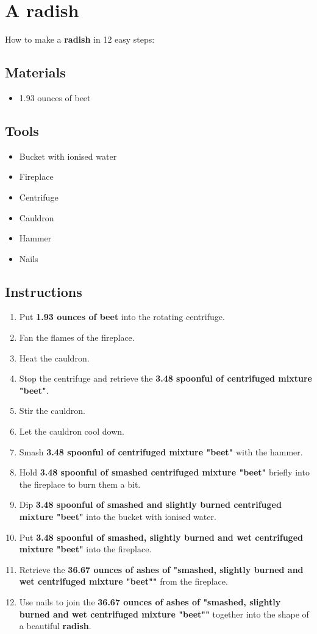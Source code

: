 \documentclass{article}
\begin{document}
\section{A radish}How to make a \textbf{radish} in 12 easy steps:

\subsection{Materials}\begin{itemize}
\item 
1.93 ounces of beet
\end{itemize}
\subsection{Tools}\begin{itemize}
\item 
Bucket with ionised water
\item 
Fireplace
\item 
Centrifuge
\item 
Cauldron
\item 
Hammer
\item 
Nails
\end{itemize}
\subsection{Instructions}\begin{enumerate}
\item 
Put \textbf{1.93 ounces of beet} into the rotating centrifuge.
\item 
Fan the flames of the fireplace.
\item 
Heat the cauldron.
\item 
Stop the centrifuge and retrieve the \textbf{3.48 spoonful of centrifuged mixture "beet"}.
\item 
Stir the cauldron.
\item 
Let the cauldron cool down.
\item 
Smash \textbf{3.48 spoonful of centrifuged mixture "beet"} with the hammer.
\item 
Hold \textbf{3.48 spoonful of smashed centrifuged mixture "beet"} briefly into the fireplace to burn them a bit.
\item 
Dip \textbf{3.48 spoonful of smashed and slightly burned centrifuged mixture "beet"} into the bucket with ionised water.
\item 
Put \textbf{3.48 spoonful of smashed, slightly burned and wet centrifuged mixture "beet"} into the fireplace.
\item 
Retrieve the \textbf{36.67 ounces of ashes of "smashed, slightly burned and wet centrifuged mixture "beet""} from the fireplace.
\item 
Use nails to join the \textbf{36.67 ounces of ashes of "smashed, slightly burned and wet centrifuged mixture "beet""} together into the shape of a beautiful \textbf{radish}.
\end{enumerate}
\newpage
\end{document}
